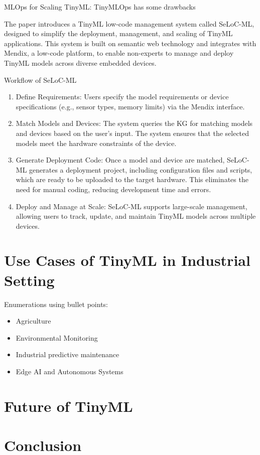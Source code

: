 \documentclass[twocolumn]{article}
\begin{document}
MLOps for Scaling TinyML: TinyMLOps has some drawbacks

The paper introduces a TinyML low-code management system called SeLoC-ML, designed to simplify the deployment, management, and scaling of TinyML applications. This system is built on semantic web technology and integrates with Mendix, a low-code platform, to enable non-experts to manage and deploy TinyML models across diverse embedded devices.

Workflow of SeLoC-ML

\begin{enumerate}
	\item Define Requirements: Users specify the model requirements or device specifications (e.g., sensor types, memory limits) via the Mendix interface.
	\item	Match Models and Devices: The system queries the KG for matching models and devices based on the user’s input. The system ensures that the selected models meet the hardware constraints of the device.
	\item	Generate Deployment Code: Once a model and device are matched, SeLoC-ML generates a deployment project, including configuration files and scripts, which are ready to be uploaded to the target hardware. This eliminates the need for manual coding, reducing development time and errors.
	\item	Deploy and Manage at Scale: SeLoC-ML supports large-scale management, allowing users to track, update, and maintain TinyML models across multiple devices.
\end{enumerate}


\section{Use Cases of TinyML in Industrial Setting}
\label{use_cases}

Enumerations using bullet points:

\begin{itemize}
	\item 	Agriculture
	\item 	Environmental Monitoring
	\item 	Industrial predictive maintenance
	\item 	Edge AI and Autonomous Systems
\end{itemize}


\section{Future of TinyML }
\label{future_of_tinyml}



\section{Conclusion}
\label{conclusion}



\nocite{hussein_original_2024,paul_rethinking_2021}




\end{document}

